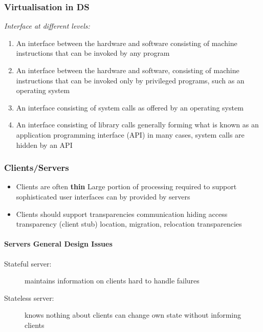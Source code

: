 \subsubsection{Virtualisation in DS}
\textit{Interface at different levels:}
\begin{enumerate}
	\item An interface between the hardware and software consisting of machine instructions
	\subitem that can be invoked by any program
	\item An interface between the hardware and software, consisting of machine instructions
	\subitem that can be invoked only by privileged programs, such as an operating system
	\item An interface consisting of system calls as offered by an operating system
	\item An interface consisting of library calls
	\subitem generally forming what is known as an application programming interface (API)
	\subitem in many cases, system calls are hidden by an API
\end{enumerate}

\subsubsection{Clients/Servers}
\begin{itemize}
	\item Clients are often \textbf{thin}
	\subitem Large portion of processing required to support sophisticated user interfaces can by provided by servers	
	\item Clients should support transparencies
	\subitem communication hiding
	\subitem access transparency (client stub)
	\subitem location, migration, relocation transparencies
\end{itemize}

\paragraph{Servers General Design Issues}
\begin{description}
	\item[Stateful server:] maintains information on clients
	\subitem hard to handle failures
	\item[Stateless server:] knows nothing about clients
	\subitem can change own state without informing clients
\end{description}
